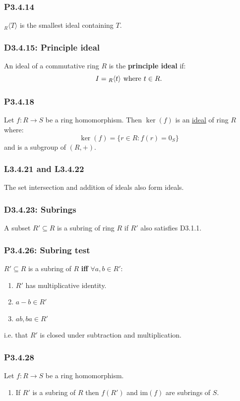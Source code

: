 \documentclass{article}
\begin{document}
\begin{multicols*}{3}
\subsubsection*{P3.4.14}
${}_R\langle T\rangle$ is the smallest ideal
containing $T$.

\subsubsection*{D3.4.15: Principle ideal}
An ideal of a commutative ring $R$ is the
\textbf{principle ideal} if:
$$I={}_R\langle t\rangle\hspace{0.05in}\text{where}
\hspace{0.05in}t\in R.$$

\subsubsection*{P3.4.18}
Let $f:R\rightarrow S$ be a ring homomorphism.
Then $\ker(f)$ is an \underline{ideal} of ring $R$ where:
$$\ker(f)=\{r\in R:f(r)=0_S\}$$
and is a subgroup of $(R,+)$.

\subsubsection*{L3.4.21 and L3.4.22}
The set intersection and addition of ideals also form ideals.

\subsubsection*{D3.4.23: Subrings}
A subset $R'\subseteq R$ is a subring of ring $R$ if
$R'$ also satisfies D3.1.1.

\subsubsection*{P3.4.26: Subring test}
$R'\subseteq R$ is a subring of $R$ \textbf{if{}f}
$\forall a,b\in R'$:
\begin{enumerate}
    \item $R'$ has multiplicative identity.
    \item $a-b\in R'$
    \item $ab,ba\in R'$
\end{enumerate}
i.e. that $R'$ is closed under subtraction
and multiplication.

\subsubsection*{P3.4.28}
Let $f:R\rightarrow S$ be a ring homomorphism.
\begin{enumerate}
    \item If $R'$ is a subring of $R$ then
    $f(R')$ and $\text{im}(f)$ are subrings of $S$.


\end{enumerate}
\end{multicols*}
\end{document}
